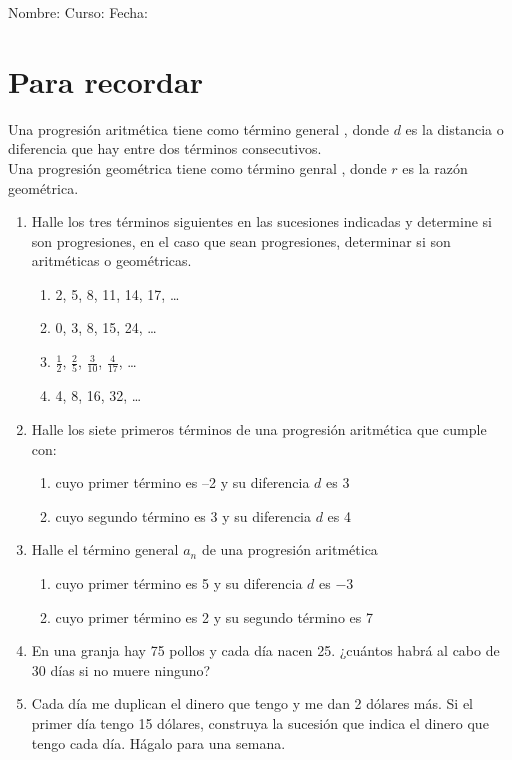 \documentclass[fleqn]{article}
\newcommand{\LineaNombre}{%
\par
\vspace{\baselineskip}
Nombre:\hrulefill \; Curso: \underline{\hspace*{48pt}} \; Fecha: \underline{\hspace*{2.5cm}} \relax
\par}
\begin{document}
\LineaNombre
\section*{Para recordar}
Una progresi\'on aritmética tiene como término general , donde $d$ es la distancia o diferencia que hay entre dos términos consecutivos.\\

Una progresión geométrica tiene como término genral ,
donde $r$ es la razón geométrica.
\begin{enumerate}
\item Halle los tres términos siguientes en las sucesiones indicadas y determine si son progresiones, en el caso que sean progresiones, determinar si son aritméticas o geométricas.
\begin{enumerate}
\item 2, 5, 8, 11, 14, 17, \ldots \noanswer
\item 0, 3, 8, 15, 24, \ldots \noanswer
\item $\frac{1}{2}$, $\frac{2}{5}$, $\frac{3}{10}$, $\frac{4}{17}$, \ldots \noanswer
\item 4, 8, 16, 32, \ldots \noanswer
\end{enumerate}
\item Halle los siete primeros términos de una progresión aritmética que cumple con:
\begin{enumerate}
\item cuyo primer término es --2 y su diferencia $d$ es 3 \noanswer
\newpage
\item cuyo segundo término es 3 y su diferencia $d$ es 4 \noanswer
\end{enumerate}
\item Halle el término general $a_{n}$ de una progresión aritmética
\begin{enumerate}
\item cuyo primer término es 5 y su diferencia $d$ es $-3$ \noanswer
\item cuyo primer término es 2 y su segundo término es 7 \noanswer
\end{enumerate}
\item En una granja hay 75 pollos y cada día nacen 25. ¿cuántos habrá al cabo de 30 días si no muere ninguno?\noanswer
\item Cada día me duplican el dinero que tengo y me dan 2 dólares más. Si el primer día tengo 15 dólares, construya la sucesión que indica el dinero que tengo cada día. Hágalo para una semana.\noanswer
\end{enumerate}
\end{document}
